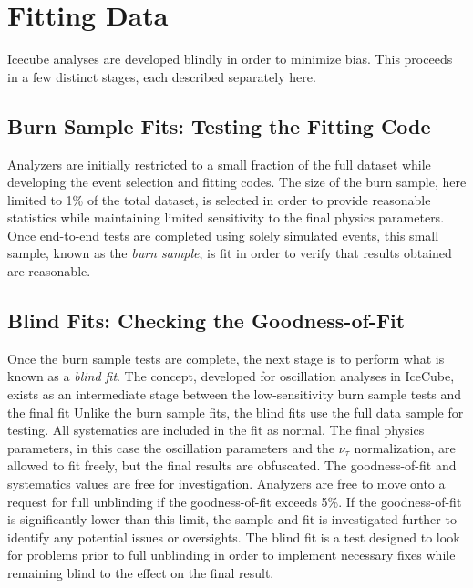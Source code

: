 \graphicspath{{chapters/analysis/images/}}
\label{sec:fitting_data}
\section{Fitting Data}
Icecube analyses are developed blindly in order to minimize bias.
This proceeds in a few distinct stages, each described separately here.

\label{subsec:burn_sample}
\subsection{Burn Sample Fits: Testing the Fitting Code}
Analyzers are initially restricted to a small fraction of the full dataset while developing the event selection and fitting codes.
The size of the burn sample, here limited to 1\% of the total dataset, is selected in order to provide reasonable statistics while maintaining limited sensitivity to the final physics parameters.
Once end-to-end tests are completed using solely simulated events, this small sample, known as the \emph{burn sample}, is fit in order to verify that results obtained are reasonable.



\label{subsec:blind_fits}
\subsection{Blind Fits: Checking the Goodness-of-Fit}
Once the burn sample tests are complete, the next stage is to perform what is known as a \emph{blind fit}.
The concept, developed for oscillation analyses in IceCube, exists as an intermediate stage between the low-sensitivity burn sample tests and the final fit 
Unlike the burn sample fits, the blind fits use the full data sample for testing.
All systematics are included in the fit as normal.
The final physics parameters, in this case the oscillation parameters and the $\nu_\tau$ normalization, are allowed to fit freely, but the final results are obfuscated.
The goodness-of-fit and systematics values are free for investigation.
Analyzers are free to move onto a request for full unblinding if the goodness-of-fit exceeds 5\%.
If the goodness-of-fit is significantly lower than this limit, the sample and fit is investigated further to identify any potential issues or oversights.
The blind fit is a test designed to look for problems prior to full unblinding in order to implement necessary fixes while remaining blind to the effect on the final result.

